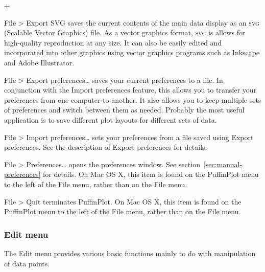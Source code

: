 \documentclass[a4paper]{article}
\newcommand{\menuitemlabel}[1]{%
\mbox{\textsf{#1}}\hfil}
\newenvironment{menuitemlist}%
{\begin{list}{}{%
\renewcommand{\makelabel}{\menuitemlabel}%
\setlength{\labelwidth}{35pt}%
\setlength{\leftmargin}%
             {\labelwidth+\labelsep}}}%
{\end{list}}
\newcommand{\ppcmd}[1]{\textsf{#1}} %
\newcommand{\caps}[1]{\textsc{#1}} %
\newcommand{\submenu}{ \textgreater{} } %
\begin{document}
\begin{menuitemlist}
\item[File\submenu Export SVG] saves the current contents of the main
data display as an \caps{svg} (Scalable Vector Graphics) file. As a vector
graphics format, \caps{svg} is allows for high-quality reproduction at any
size. It can also be easily edited and incorporated into other graphics using
vector graphics programs such as Inkscape and Adobe Illustrator.

\item[File\submenu Export preferences\ldots] saves your current preferences to
a file. In conjunction with the \ppcmd{Import preferences} feature, this
allows you to transfer your preferences from one computer to another. It also
allows you to keep multiple sets of preferences and switch between them as
needed. Probably the most useful application is to save different plot
layouts for different sets of data.

\item[File\submenu Import preferences\ldots] sets your preferences from
a file saved using \ppcmd{Export preferences}. See the description of
\ppcmd{Export preferences} for details.

\item[File\submenu Preferences\ldots] opens the preferences window. See
section~\ref{sec:manual-preferences} for details. On Mac OS X, this item is
found on the \ppcmd{PuffinPlot} menu to the left of the \ppcmd{File} menu,
rather than on the \ppcmd{File} menu.

\item[File\submenu Quit] terminates PuffinPlot. On Mac OS X, this item is
found on the \ppcmd{PuffinPlot} menu to the left of the \ppcmd{File} menu,
rather than on the \ppcmd{File} menu.

\end{menuitemlist}

\FloatBarrier
\subsubsection{Edit menu}

The \ppcmd{Edit} menu provides various basic functions mainly
to do with manipulation of data points.
\end{document}
